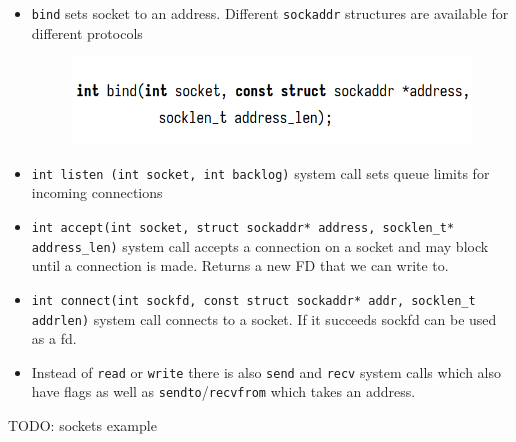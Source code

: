 \documentclass[../notes.tex]{subfiles}
\begin{document}
\begin{itemize}
    \item \texttt{bind} sets socket to an address. Different \texttt{sockaddr} structures are available for different protocols
        \begin{figure}[H]
            \centering
            \includegraphics[width=0.8\linewidth]{img/image_2023-03-22-01-01-37.png}
            \label{fig:}
        \end{figure}
    \item \texttt{int listen (int socket, int backlog)} system call sets queue limits for incoming connections

    \item \texttt{int accept(int socket, struct sockaddr* address, socklen\_t* address\_len)} system call accepts a connection on a socket and may block until a connection is made. Returns a new FD that we can write to.
    \item \texttt{int connect(int sockfd, const struct sockaddr* addr, socklen\_t addrlen)} system call connects to a socket. If it succeeds sockfd can be used as a fd.
    \item Instead of \texttt{read} or \texttt{write} there is also \texttt{send} and \texttt{recv} system calls which also have flags as well as \texttt{sendto}/\texttt{recvfrom} which takes an address.
\end{itemize}


\begin{blockquote}
    TODO: sockets example
\end{blockquote}
\end{document}
